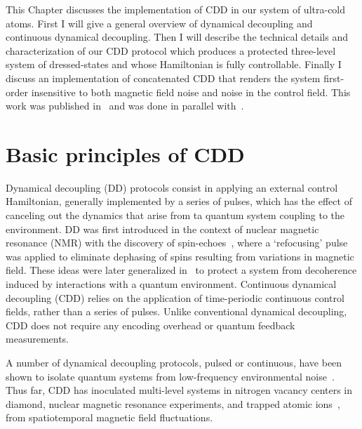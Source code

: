 This Chapter discusses the implementation of CDD in our system of ultra-cold atoms. First I will give a general overview of dynamical decoupling and continuous dynamical decoupling. Then I will describe the technical details and characterization of our CDD protocol which produces a protected three-level system of dressed-states and whose Hamiltonian is fully controllable. Finally I discuss an implementation of concatenated CDD that renders the system first-order insensitive to both magnetic field noise and noise in the control field. This work was published in~\cite{trypogeorgos_synthetic_2018} and was done in parallel with~\cite{anderson_continuously_2018}.

\section{Basic principles of CDD}

Dynamical decoupling (DD) protocols consist in applying an external control Hamiltonian, generally implemented by a series of pulses, which has the effect of canceling out the dynamics that arise from ta quantum system coupling to the environment. DD was first introduced in the context of nuclear magnetic resonance (NMR) with the discovery of spin-echoes~\cite{hahn_spin_1950}, where a `refocusing' pulse was applied to eliminate dephasing of spins resulting from variations in magnetic field. These ideas were later generalized in~\cite{viola_dynamical_1998} to protect a system from decoherence induced by interactions with a quantum environment. Continuous dynamical decoupling (CDD) relies on the application of time-periodic continuous control fields, rather than a series of pulses. Unlike conventional dynamical decoupling, CDD does not require any encoding overhead or quantum feedback measurements. 

A number of dynamical decoupling protocols, pulsed or continuous, have been shown to isolate quantum systems from low-frequency environmental noise~\cite{cohen_continuous_2017,fanchini_continuously_2007,aharon_fully_2016,biercuk_optimized_2009,cai_robust_2012,bermudez_robust_2012,baumgart_ultrasensitive_2016,kazakov_magic_2015,sarkany_controlling_2014}. Thus far, CDD has inoculated multi-level systems in nitrogen vacancy centers in diamond, nuclear magnetic resonance experiments, and trapped atomic ions~\cite{laucht_dressed_2017,farfurnik_experimental_2017,noguchi_generation_2012,golter_protecting_2014,timoney_quantum_2011,webster_simple_2013,barfuss_strong_2015,rohr_synchronizing_2014}, from spatiotemporal magnetic field fluctuations. 

